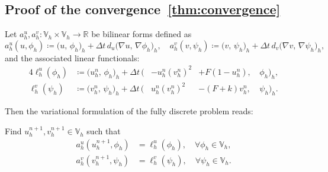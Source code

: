 \documentclass[11pt, a4paper]{amsart}
\newcommand{\VV}{\mathbb{V}}
\numberwithin{equation}{section}
\begin{document}
	\subsection{\texorpdfstring{Proof of the convergence~\cref{thm:convergence}}{Proof of the convergence result}}\label{subsec:convergence}

	Let  $a_h^u, a_h^v : \VV_h \times \VV_h \rightarrow \mathbb{R}$ be bilinear forms defined as
	\[
	a_h^u(u,\phi_h) \coloneqq \big(u, \,\phi_h\big)_h + \Delta t\, d_u \big( \nabla u,\, \nabla\phi_h\big)_h, \quad
	a_h^v(v,\psi_h) \coloneqq \big(v, \,\psi_h\big)_h + \Delta t\, d_v \big(\nabla v,\, \nabla\psi_h\big)_h,
	\]
	and the associated linear functionals:
	\begin{alignat*}{4}
	 	\ell_h^u(\phi_h) &\coloneqq \big(u_h^n,\, \phi_h \big)_h + \Delta t\, \big(&-u_h^n (v_h^n)^2 &+ F(1 - u_h^n),\, &\phi_h \big)_h, 
		\\
		\ell_h^v(\psi_h) &\coloneqq \big(v_h^n,\, \psi_h \big)_h + \Delta t\, \big(& u_h^n (v_h^n)^2 &- (F + k) v_h^n, \,&\psi_h \big)_h.
	\end{alignat*}
	
	Then the variational formulation of the fully discrete problem reads:  
	
	Find $u_h^{n+1}, v_h^{n+1} \in \VV_h$ such that
	\begin{align}
		a_h^u(u_h^{n+1}, \phi_h) &= \ell_h^u(\phi_h), \quad \forall \phi_h \in \VV_h, \label{eq:discrete_gs_vfu} 
		\\
		a_h^v(v_h^{n+1}, \psi_h) &= \ell_h^v(\psi_h), \quad \forall \psi_h \in \VV_h. \label{eq:discrete_gs_vfv}
	\end{align}
	
\end{document}
